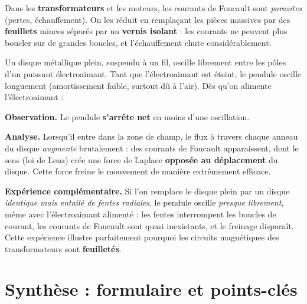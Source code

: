 \documentclass[11pt,a4paper]{article}
\begin{document}
\begin{attention}
Dans les \textbf{transformateurs} et les moteurs, les courants de Foucault sont \emph{parasites}
(pertes, échauffement). On les réduit en remplaçant les pièces massives par des \textbf{feuillets}
minces séparés par un \textbf{vernis isolant} : les courants ne peuvent plus boucler sur de grandes
boucles, et l'échauffement chute considérablement.
\end{attention}

\begin{exemple}
Un disque métallique plein, suspendu à un fil, oscille librement entre les pôles d'un puissant
électroaimant. Tant que l'électroaimant est éteint, le pendule oscille longuement (amortissement
faible, surtout dû à l'air). Dès qu'on alimente l'électroaimant :

\smallskip
\textbf{Observation.} Le pendule \textbf{s'arrête net} en moins d'une oscillation.

\textbf{Analyse.} Lorsqu'il entre dans la zone de champ, le flux à travers chaque anneau du disque
\emph{augmente} brutalement : des courants de Foucault apparaissent, dont le sens (loi de Lenz) crée
une force de Laplace \textbf{opposée au déplacement} du disque. Cette force freine le mouvement de
manière extrêmement efficace.

\textbf{Expérience complémentaire.} Si l'on remplace le disque plein par un disque \emph{identique
mais entailé de fentes radiales}, le pendule oscille \emph{presque librement}, même avec
l'électroaimant alimenté : les fentes interrompent les boucles de courant, les courants de Foucault
sont quasi inexistants, et le freinage disparaît. Cette expérience illustre parfaitement pourquoi
les circuits magnétiques des transformateurs sont \textbf{feuilletés}.
\end{exemple}

\section{Synthèse : formulaire et points-clés}
\end{document}
